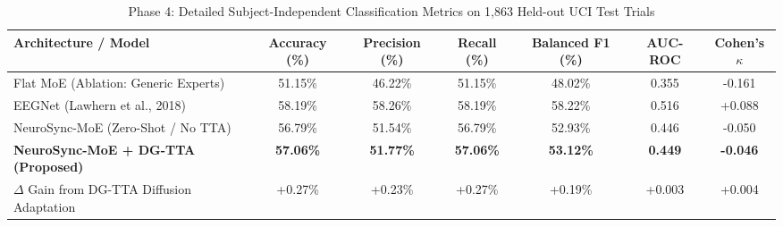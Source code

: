 \begin{table}[t]
\centering
\caption{Phase 4: Detailed Subject-Independent Classification Metrics on 1,863 Held-out UCI Test Trials}
\label{tab:phase4_primary_metrics}
\begin{tabular}{lcccccc}
\hline
\textbf{Architecture / Model} & \textbf{Accuracy (\%)} & \textbf{Precision (\%)} & \textbf{Recall (\%)} & \textbf{Balanced F1 (\%)} & \textbf{AUC-ROC} & \textbf{Cohen's $\kappa$} \\
\hline
Flat MoE (Ablation: Generic Experts) & 51.15\% & 46.22\% & 51.15\% & 48.02\% & 0.355 & -0.161 \\
EEGNet (Lawhern et al., 2018) & 58.19\% & 58.26\% & 58.19\% & 58.22\% & 0.516 & +0.088 \\
NeuroSync-MoE (Zero-Shot / No TTA) & 56.79\% & 51.54\% & 56.79\% & 52.93\% & 0.446 & -0.050 \\
\textbf{NeuroSync-MoE + DG-TTA (Proposed)} & \textbf{57.06\%} & \textbf{51.77\%} & \textbf{57.06\%} & \textbf{53.12\%} & \textbf{0.449} & \textbf{-0.046} \\
\hline
$\Delta$ Gain from DG-TTA Diffusion Adaptation & +0.27\% & +0.23\% & +0.27\% & +0.19\% & +0.003 & +0.004 \\
\hline
\end{tabular}
\end{table}